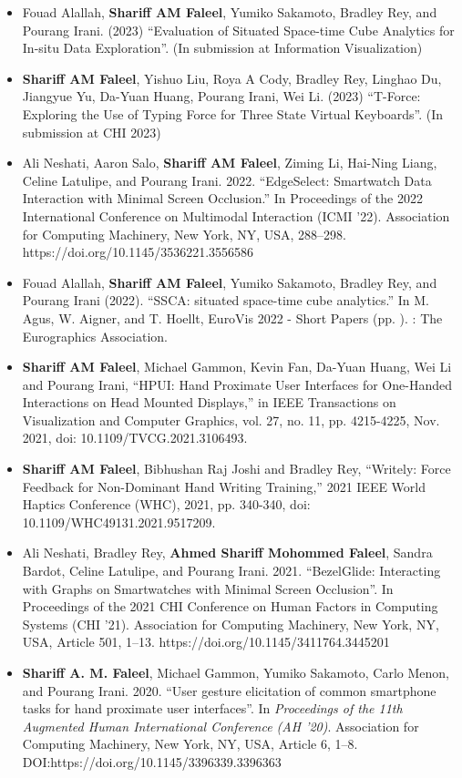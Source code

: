 \documentclass[a4paper,9.5pt]{article}
\begin{document}
\begin{itemize}
  \item[]Fouad Alallah, \textbf{Shariff AM Faleel}, Yumiko Sakamoto, Bradley Rey, and Pourang Irani. (2023) ``Evaluation of Situated Space-time Cube Analytics for In-situ Data Exploration''. (In submission at Information Visualization)
  \item[]\textbf{Shariff AM Faleel}, Yishuo Liu, Roya A Cody, Bradley Rey, Linghao Du, Jiangyue Yu, Da-Yuan Huang, Pourang Irani, Wei Li. (2023) ``T-Force: Exploring the Use of Typing Force for Three State Virtual Keyboards''. (In submission at CHI 2023)
  \item[]Ali Neshati, Aaron Salo, \textbf{Shariff AM Faleel}, Ziming Li, Hai-Ning Liang, Celine Latulipe, and Pourang Irani. 2022. ``EdgeSelect: Smartwatch Data Interaction with Minimal Screen Occlusion.'' In Proceedings of the 2022 International Conference on Multimodal Interaction (ICMI '22). Association for Computing Machinery, New York, NY, USA, 288–298. \\https://doi.org/10.1145/3536221.3556586
  \item[]Fouad Alallah, \textbf{Shariff AM Faleel}, Yumiko Sakamoto, Bradley Rey, and Pourang Irani (2022). ``SSCA: situated space-time cube analytics.'' In M. Agus, W. Aigner, and T. Hoellt, EuroVis 2022 - Short Papers (pp. ). : The Eurographics Association.
  \item[]\textbf{Shariff AM Faleel}, Michael Gammon, Kevin Fan, Da-Yuan Huang, Wei Li and Pourang Irani, ``HPUI: Hand Proximate User Interfaces for One-Handed Interactions on Head Mounted Displays,'' in IEEE Transactions on Visualization and Computer Graphics, vol. 27, no. 11, pp. 4215-4225, Nov. 2021, doi: 10.1109/TVCG.2021.3106493.
  \item[]\textbf{Shariff AM Faleel}, Bibhushan Raj Joshi and Bradley Rey, ``Writely: Force Feedback for Non-Dominant Hand Writing Training,'' 2021 IEEE World Haptics Conference (WHC), 2021, pp. 340-340, doi: 10.1109/WHC49131.2021.9517209.
  \item[]Ali Neshati, Bradley Rey, \textbf{Ahmed Shariff Mohommed Faleel}, Sandra Bardot, Celine Latulipe, and Pourang Irani. 2021. ``BezelGlide: Interacting with Graphs on Smartwatches with Minimal Screen Occlusion''. In Proceedings of the 2021 CHI Conference on Human Factors in Computing Systems (CHI '21). Association for Computing Machinery, New York, NY, USA, Article 501, 1–13. https://doi.org/10.1145/3411764.3445201
  \item[]\textbf{Shariff A. M. Faleel}, Michael Gammon, Yumiko Sakamoto, Carlo Menon, and Pourang Irani. 2020. ``User gesture elicitation of common smartphone tasks for hand proximate user interfaces''. In \textit{Proceedings of the 11th Augmented Human International Conference (AH '20)}. Association for Computing Machinery, New York, NY, USA, Article 6, 1–8. \\DOI:https://doi.org/10.1145/3396339.3396363

\end{itemize}
\end{document}
